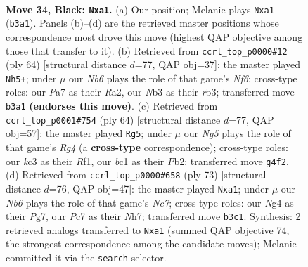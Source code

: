 \documentclass[11pt]{article}
\begin{document}
\clearpage

\begin{figure}[p]\centering
\begin{subfigure}{0.46\textwidth}\centering
\resizebox{\linewidth}{!}{%
\newchessgame
\chessboard[
  setfen={1r4k1/p1p2pp1/7p/4rb1P/p1P3n1/1nK5/6R1/R1B2BN1 b - - 2 34},
  showmover=false,
  pgfstyle=straightmove, color=movearrow, markmove={b3-a1}
]}
\caption{}
\end{subfigure}\hfill
\begin{subfigure}{0.46\textwidth}\centering
\resizebox{\linewidth}{!}{%
\newchessgame
\chessboard[
  setfen={2b2r2/5pkp/3R1N2/2n1pp2/4P2P/1rP3P1/R5B1/6K1 w - - 4 33},
  showmover=false,
  pgfstyle=straightmove, color=movearrow, markmove={f6-h5}
]}
\caption{}
\end{subfigure}
\\[4pt]
\begin{subfigure}{0.46\textwidth}\centering
\resizebox{\linewidth}{!}{%
\newchessgame
\chessboard[
  setfen={8/5rk1/p4nN1/1p2p3/6R1/P6P/1PrN1bP1/5R1K w - - 1 33},
  showmover=false,
  pgfstyle=straightmove, color=movearrow, markmove={g4-g5}
]}
\caption{}
\end{subfigure}\hfill
\begin{subfigure}{0.46\textwidth}\centering
\resizebox{\linewidth}{!}{%
\newchessgame
\chessboard[
  setfen={1r4k1/4rppn/2B4p/4p3/R1N3P1/3bP2P/2n2PK1/B1R5 b - - 0 37},
  showmover=false,
  pgfstyle=straightmove, color=movearrow, markmove={c2-a1}
]}
\caption{}
\end{subfigure}
\caption{\textbf{Move 34, Black: \texttt{Nxa1}.} (a) Our position; Melanie plays \texttt{Nxa1} (\texttt{b3a1}). Panels (b)--(d) are the retrieved master positions whose correspondence most drove this move (highest QAP objective among those that transfer to it). (b) Retrieved from \texttt{ccrl\_top\_p0000\#12} (ply 64) [structural distance $d$=77, QAP obj=37]: the master played \texttt{Nh5+}; under $\mu$ our \emph{Nb6} plays the role of that game's \emph{Nf6}; cross-type roles: our \emph{P}a7 as their \emph{R}a2, our \emph{N}b3 as their \emph{r}b3; transferred move \texttt{b3a1} \textbf{(endorses this move)}. (c) Retrieved from \texttt{ccrl\_top\_p0001\#754} (ply 64) [structural distance $d$=77, QAP obj=57]: the master played \texttt{Rg5}; under $\mu$ our \emph{Ng5} plays the role of that game's \emph{Rg4} (a \textbf{cross-type} correspondence); cross-type roles: our \emph{k}c3 as their \emph{R}f1, our \emph{b}c1 as their \emph{P}b2; transferred move \texttt{g4f2}. (d) Retrieved from \texttt{ccrl\_top\_p0000\#658} (ply 73) [structural distance $d$=76, QAP obj=47]: the master played \texttt{Nxa1}; under $\mu$ our \emph{Nb6} plays the role of that game's \emph{Nc7}; cross-type roles: our \emph{N}g4 as their \emph{P}g7, our \emph{P}c7 as their \emph{N}h7; transferred move \texttt{b3c1}. Synthesis: 2 retrieved analogs transferred to \texttt{Nxa1} (summed QAP objective 74, the strongest correspondence among the candidate moves); Melanie committed it via the \texttt{search} selector.}
\label{fig:thought-m67}
\end{figure}
\end{document}
